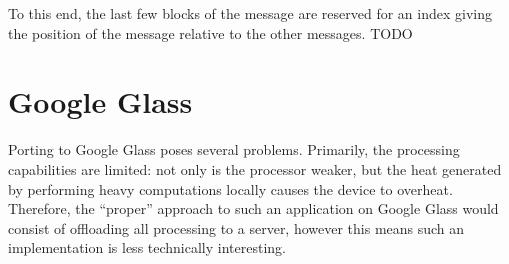 \documentclass[11pt, letterpaper]{article}
\begin{document}
To this end, the last few blocks of the message are reserved for an index giving the position of the message relative to the other messages.
TODO

\section{Google Glass}
Porting to Google Glass poses several problems. Primarily, the processing capabilities are limited: not only is the processor weaker, but the heat generated by performing heavy computations locally causes the device to overheat.
Therefore, the ``proper'' approach to such an application on Google Glass would consist of offloading all processing to a server, however this means such an implementation is less technically interesting.

\printbibliography
\end{document}

